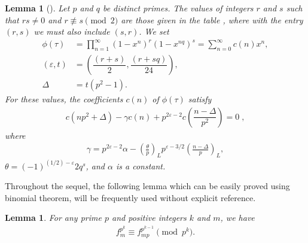\documentclass[11pt,a4paper]{article}
\numberwithin{equation}{section}
\theoremstyle{plain}
\newtheorem{lemma}[theorem]{Lemma}
\begin{document}
\begin{lemma}[{{\cite[Theorem~3]{newman62}}}]\label{lnew62}
	Let $p$ and $q$ be distinct primes. The values of integers $r$ and $s$ such that $rs\not=0$ and $r\not\equiv s\pmod2$ are those given in the table \cite{newman62}, where with the entry $(r,s)$ we must also include $(s,r)$. We set
	\begin{align*}
		\phi(\tau)&=\prod_{n=1}^{\infty}(1-x^n)^r(1-x^{nq})^s=\sum_{n=0}^{\infty}c(n)x^n,\\
		(\varepsilon, t)&= \displaystyle\left(\dfrac{(r+s)}{2}, \dfrac{(r+sq)}{24}\right),\\
		\Delta&=t(p^2-1).
	\end{align*}
	For these values, the coefficients $c(n)$ of $\phi(\tau)$ satisfy
	\begin{align*}
		c(np^2+\Delta)-\gamma c(n)+p^{2\varepsilon-2}c\displaystyle\left(\dfrac{n-\Delta}{p^2}\right)=0\;,
	\end{align*}
	where 
	\begin{align*}
		\gamma=p^{2\varepsilon-2}\alpha-\displaystyle\left(\frac{\theta}{p}\right)_L p^{\varepsilon-3/2}\displaystyle\left(\frac{n-\Delta}{p}\right)_L,
	\end{align*}
	$\theta=(-1)^{(1/2)-\varepsilon} 2q^s$, and
	$\alpha$ is a constant.
\end{lemma}
Throughout the sequel, the following lemma which can be easily proved using binomial theorem, will be frequently used without explicit reference.
\begin{lemma}\label{bt}
	For any prime $p$ and positive integers $k$ and $m$, we have
	\begin{align*}
		f_m^{p^k} \equiv f_{mp}^{p^{k-1}} \pmod{p^k}.
	\end{align*}
\end{lemma}
\end{document}
